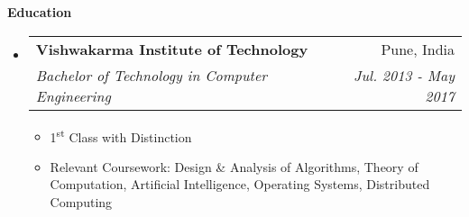 \documentclass[letterpaper,12pt]{article}
\makeatletter
\newcommand{\ts}{\textsuperscript}
\newcommand{\resitem}[1]{\item #1 \vspace{-2pt}}
\newcommand{\resheading}[1]{{\large \colorbox{mygrey}{\begin{minipage}{\textwidth}{\textbf{#1 \vphantom{p\^{E}}}}\end{minipage}}}}
\newcommand{\ressubheading}[4]{
  \begin{tabular*}{7.0in}{l@{\extracolsep{\fill}}r}
    \textbf{#1} & #2 \\
    \textit{#3} & \textit{#4} \\
  \end{tabular*}\vspace{-6pt}}
\newif\ifhighschool
\makeatother
\begin{document}
\resheading{Education}
\begin{itemize}
\item
  \ressubheading{Vishwakarma Institute of Technology}{Pune, India}{Bachelor of Technology in Computer Engineering}{Jul. 2013 - May 2017}
  \begin{itemize}
    \resitem{1\ts{st} Class with Distinction}
    \resitem{Relevant Coursework: Design \& Analysis of Algorithms, Theory of Computation, Artificial Intelligence, Operating Systems, Distributed Computing}
  \end{itemize}
  \ifhighschool	
\item
  \ressubheading{Delhi Public School}{Pune, India}{12th Grade CBSE}{May 2013}
  \begin{itemize}
    \resitem{Percentage: 76.4\%}
  \end{itemize}
\item
  \ressubheading{Delhi Public School}{Pune, India}{10th Grade CBSE}{May 2011}
  \begin{itemize}
    \resitem{CGPA: 8.6}
  \end{itemize}
  \fi
\end{itemize}

\pagebreak
\end{document}
